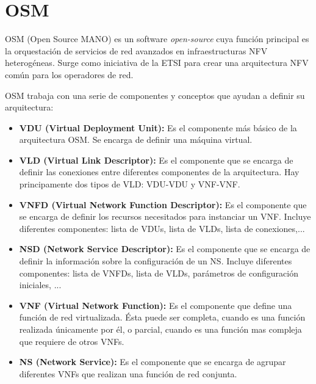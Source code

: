 \section{OSM}
\label{sec:osm}

OSM (Open Source MANO) es un software \textit{open-source} cuya función principal es la orquestación de servicios de red avanzados en infraestructuras NFV heterogéneas. Surge como iniciativa de la ETSI para crear una arquitectura NFV común para los operadores de red.

OSM trabaja con una serie de componentes y conceptos que ayudan a definir su arquitectura:

\begin{itemize}
	\item \textbf{VDU (Virtual Deployment Unit):} Es el componente más básico de la arquitectura OSM. Se encarga de definir una máquina virtual. 
	
	\item \textbf{VLD (Virtual Link Descriptor):} Es el componente que se encarga de definir las conexiones entre diferentes componentes de la arquitectura. Hay principamente dos tipos de VLD: VDU-VDU y VNF-VNF.
	
	\item \textbf{VNFD (Virtual Network Function Descriptor):} Es el componente que se encarga de definir los recursos necesitados para instanciar un VNF. Incluye diferentes componentes: lista de VDUs, lista de VLDs, lista de conexiones,...
	
	\item \textbf{NSD (Network Service Descriptor):} Es el componente que se encarga de definir la información sobre la configuración de un NS. Incluye diferentes componentes: lista de VNFDs, lista de VLDs, parámetros de configuración iniciales, ...
	
	\item \textbf{VNF (Virtual Network Function):} Es el componente que define una función de red virtualizada. Ésta puede ser completa, cuando es una función realizada únicamente por él, o parcial, cuando es una función mas compleja que requiere de otros VNFs.
	
	\item \textbf{NS (Network Service):} Es el componente que se encarga de agrupar diferentes VNFs que realizan una función de red conjunta.
\end{itemize}

